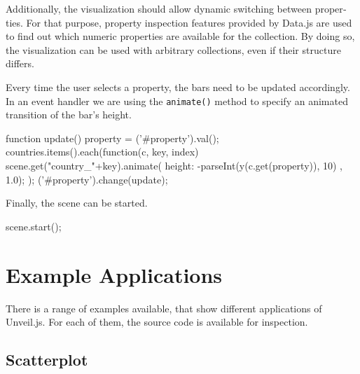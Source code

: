 \begin{english}
\SuperPar Additionally, the visualization should allow dynamic switching between properties. For that purpose, property inspection features provided by Data.js are used to find out which numeric properties are available for the collection. By doing so, the visualization can be used with arbitrary collections, even if their structure differs.


\SuperPar Every time the user selects a property, the bars need to be updated accordingly. In an event handler we are using the \texttt{animate()} method to specify an animated transition of the bar's height.


\begin{program}[h!]
\begin{CppSourceCode}
function update() {
  property = ('#property').val();
  countries.items().each(function(c, key, index) {
    scene.get("country_"+key).animate({
      height: -parseInt(y(c.get(property)), 10)
    }, 1.0);
  });
}
('#property').change(update);
\end{CppSourceCode}
\end{program}

\SuperPar Finally, the scene can be started.

\begin{program}[h!]
\begin{CppSourceCode}
scene.start();  
\end{CppSourceCode}
\end{program}

\section{Example Applications}


There is a range of examples available, that show different applications of Unveil.js. For each of them, the source code is available for inspection.

\subsection{Scatterplot}


\end{english}

